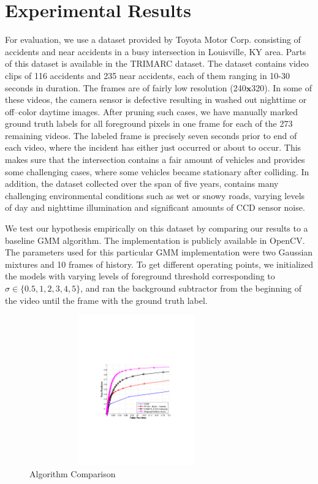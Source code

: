 \documentclass{article}
\begin{document}
\section{Experimental Results}
For evaluation, we use a dataset provided by Toyota Motor Corp. consisting of accidents and near accidents in a busy intersection in Louisville, KY area.  Parts of this dataset is available in the TRIMARC dataset\cite{toyota_dataset}.  The dataset contains video clips of 116 accidents and 235 near accidents, each of them ranging in 10-30 seconds in duration.  The frames are of fairly low resolution (240$\mathbf{x}$320). In some of these videos, the camera sensor is defective resulting in washed out nighttime or off--color daytime images.  After pruning such cases, we have manually marked ground truth labels for all foreground pixels in one frame for each of the 273 remaining videos.  The labeled frame is precisely seven seconds prior to end of each video, where the incident has either just occurred or about to occur.  This makes sure that the intersection contains a fair amount of vehicles and provides some challenging cases, where some vehicles became stationary after colliding.  In addition, the dataset collected over the span of five years, contains many challenging environmental conditions such as wet or snowy roads, varying levels of day and nighttime illumination and significant amounts of CCD sensor noise.

We test our hypothesis empirically on this dataset by comparing our results to a baseline GMM\cite{ZivGMM} algorithm.  The implementation is publicly available in OpenCV\cite{opencv_library}.  The parameters used for this particular GMM implementation were two Gaussian mixtures and 10 frames of history.  To get different operating points, we initialized the models with varying levels of foreground threshold corresponding to $\sigma \in \{0.5, 1, 2, 3, 4, 5\}$, and ran the background subtractor from the beginning of the video until the frame with the ground truth label.

\begin{figure}[htb]
\begin{minipage}[b]{\linewidth}
  \centering
  \centerline{\includegraphics[trim = 35mm 87mm 30mm 92mm, clip,  width=9.25cm, height = 6.5cm]{Imgs/ROC_comp_curve_zoom.pdf}}
\end{minipage}

\caption{Algorithm Comparison}
\label{fig:roc}
\end{figure}
\end{document}
